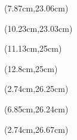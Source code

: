 \documentclass[a4paper]{article}
\begin{document}
\begin{Form}
\begin{textblock*}{0.3cm}(7.87cm,23.06cm) %
\end{textblock*}

\begin{textblock*}{3.2cm}(10.23cm,23.03cm) %
\end{textblock*}

\begin{textblock*}{0.3cm}(11.13cm,25cm) %
\end{textblock*}

\begin{textblock*}{0.3cm}(12.8cm,25cm) %
\end{textblock*}

\begin{textblock*}{0.3cm}(2.74cm,26.25cm) %
\end{textblock*}

\begin{textblock*}{5.55cm}(6.85cm,26.24cm) %
\end{textblock*}

\begin{textblock*}{0.3cm}(2.74cm,26.67cm) %
\end{textblock*}

~\clearpage



\end{Form}
\end{document}
